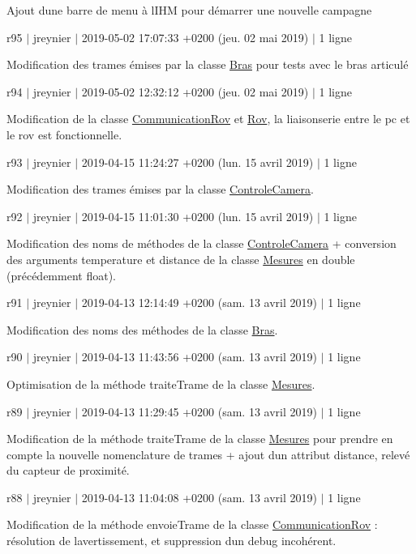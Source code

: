 Ajout d\textquotesingle{}une barre de menu à l\textquotesingle{}I\+HM pour démarrer une nouvelle campagne

r95 $\vert$ jreynier $\vert$ 2019-\/05-\/02 17\+:07\+:33 +0200 (jeu. 02 mai 2019) $\vert$ 1 ligne

Modification des trames émises par la classe \hyperlink{class_bras}{Bras} pour tests avec le bras articulé

r94 $\vert$ jreynier $\vert$ 2019-\/05-\/02 12\+:32\+:12 +0200 (jeu. 02 mai 2019) $\vert$ 1 ligne

Modification de la classe \hyperlink{class_communication_rov}{Communication\+Rov} et \hyperlink{class_rov}{Rov}, la liaisonserie entre le pc et le rov est fonctionnelle.

r93 $\vert$ jreynier $\vert$ 2019-\/04-\/15 11\+:24\+:27 +0200 (lun. 15 avril 2019) $\vert$ 1 ligne

Modification des trames émises par la classe \hyperlink{class_controle_camera}{Controle\+Camera}.

r92 $\vert$ jreynier $\vert$ 2019-\/04-\/15 11\+:01\+:30 +0200 (lun. 15 avril 2019) $\vert$ 1 ligne

Modification des noms de méthodes de la classe \hyperlink{class_controle_camera}{Controle\+Camera} + conversion des arguments temperature et distance de la classe \hyperlink{class_mesures}{Mesures} en double (précédemment float).

r91 $\vert$ jreynier $\vert$ 2019-\/04-\/13 12\+:14\+:49 +0200 (sam. 13 avril 2019) $\vert$ 1 ligne

Modification des noms des méthodes de la classe \hyperlink{class_bras}{Bras}.

r90 $\vert$ jreynier $\vert$ 2019-\/04-\/13 11\+:43\+:56 +0200 (sam. 13 avril 2019) $\vert$ 1 ligne

Optimisation de la méthode traite\+Trame de la classe \hyperlink{class_mesures}{Mesures}.

r89 $\vert$ jreynier $\vert$ 2019-\/04-\/13 11\+:29\+:45 +0200 (sam. 13 avril 2019) $\vert$ 1 ligne

Modification de la méthode traite\+Trame de la classe \hyperlink{class_mesures}{Mesures} pour prendre en compte la nouvelle nomenclature de trames + ajout d\textquotesingle{}un attribut distance, relevé du capteur de proximité.

r88 $\vert$ jreynier $\vert$ 2019-\/04-\/13 11\+:04\+:08 +0200 (sam. 13 avril 2019) $\vert$ 1 ligne

Modification de la méthode envoie\+Trame de la classe \hyperlink{class_communication_rov}{Communication\+Rov} \+: résolution de l\textquotesingle{}avertissement, et suppression d\textquotesingle{}un debug incohérent.

